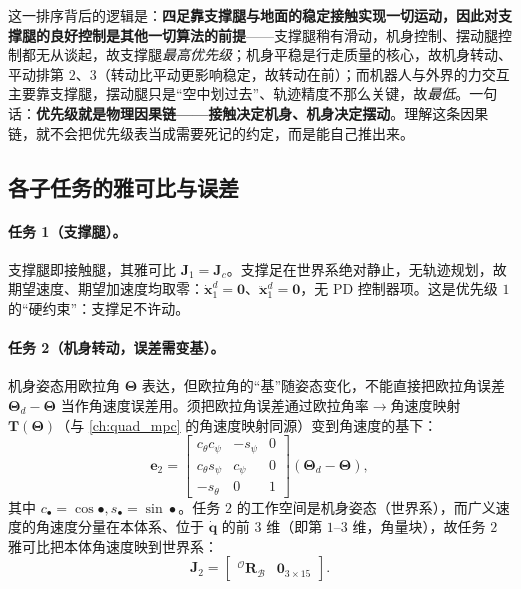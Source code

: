 \begin{insight}[优先级排序 $=$ 物理因果链（接触$\to$机身$\to$摆动）]\label{ins:qw-priority-chain}
这一排序背后的逻辑是：\textbf{四足靠支撑腿与地面的稳定接触实现一切运动，因此对支撑腿的良好控制是其他一切算法的前提}——支撑腿稍有滑动，机身控制、摆动腿控制都无从谈起，故支撑腿\emph{最高优先级}；机身平稳是行走质量的核心，故机身转动、平动排第 $2$、$3$（转动比平动更影响稳定，故转动在前）；而机器人与外界的力交互主要靠支撑腿，摆动腿只是“空中划过去”、轨迹精度不那么关键，故\emph{最低}。一句话：\textbf{优先级就是物理因果链——接触决定机身、机身决定摆动}。理解这条因果链，就不会把优先级表当成需要死记的约定，而是能自己推出来。
\end{insight}

\subsection{各子任务的雅可比与误差}
\label{subsec:qw-subtask-jac}

\paragraph{任务 1（支撑腿）。}
支撑腿即接触腿，其雅可比 $\boldsymbol{J}_1=\boldsymbol{J}_c$。支撑足在世界系绝对静止，无轨迹规划，故期望速度、期望加速度均取零：$\dot{\boldsymbol{x}}_1^d=\mathbf{0}$、$\ddot{\boldsymbol{x}}_1^d=\mathbf{0}$，无 PD 控制器项\cite{yu2021quadruped}。这是优先级 $1$ 的“硬约束”：支撑足不许动。

\paragraph{任务 2（机身转动，误差需变基）。}
机身姿态用欧拉角 $\boldsymbol{\Theta}$ 表达，但欧拉角的“基”随姿态变化，不能直接把欧拉角误差 $\boldsymbol{\Theta}_d-\boldsymbol{\Theta}$ 当作角速度误差用。须把欧拉角误差通过欧拉角率$\to$角速度映射 $\boldsymbol{T}(\boldsymbol{\Theta})$（与 \cref{ch:quad_mpc} 的角速度映射同源）变到角速度的基下\cite{yu2021quadruped}：
\begin{equation}
  \boldsymbol{e}_2=\begin{bmatrix}c_\theta c_\psi & -s_\psi & 0\\ c_\theta s_\psi & c_\psi & 0\\ -s_\theta & 0 & 1\end{bmatrix}(\boldsymbol{\Theta}_d-\boldsymbol{\Theta}),
  \label{eq:qw-e2}
\end{equation}
其中 $c_\bullet=\cos\bullet,s_\bullet=\sin\bullet$。任务 $2$ 的工作空间是机身姿态（世界系），而广义速度的角速度分量在本体系、位于 $\dot{\boldsymbol{q}}$ 的前 $3$ 维（即第 $1$--$3$ 维，角量块），故任务 $2$ 雅可比把本体角速度映到世界系\cite{yu2021quadruped}：
\begin{equation}
  \boldsymbol{J}_2=\begin{bmatrix}{}^{\mathcal{O}}\mathbf{R}_{\mathcal{B}} & \mathbf{0}_{3\times15}\end{bmatrix}.
  \label{eq:qw-J2}
\end{equation}


